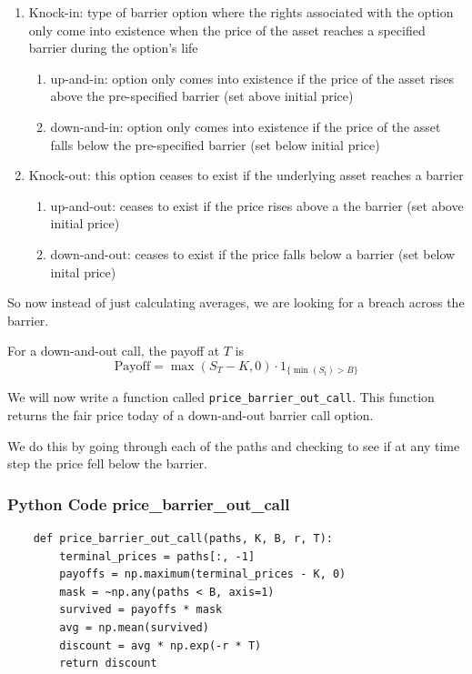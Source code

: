 \documentclass{article}
\begin{document}
\begin{enumerate}
    \item Knock-in: type of barrier option where the rights associated with the option only come into existence when the price of the asset reaches a specified barrier during the option's life
    \begin{enumerate}
        \item up-and-in: option only comes into existence if the price of the asset rises above the pre-specified barrier (set above initial price)
        \item down-and-in: option only comes into existence if the price of the asset falls below the pre-specified barrier (set below initial price)
    \end{enumerate}
    \item Knock-out: this option ceases to exist if the underlying asset reaches a barrier
    \begin{enumerate}
        \item up-and-out: ceases to exist if the price rises above a the barrier (set above initial price)
        \item down-and-out: ceases to exist if the price falls below a barrier (set below inital price)
    \end{enumerate}
\end{enumerate}

So now instead of just calculating averages, we are looking for a breach across the barrier.

For a down-and-out call, the payoff at \(T\) is \[\text{Payoff}=\max(S_T-K,0)\cdot1_{\{\min(S_t)>B\}}\]

We will now write a function called \texttt{price\_barrier\_out\_call}. This function returns the fair price today of a down-and-out barrier call option.

We do this by going through each of the paths and checking to see if at any time step the price fell below the barrier.

\subsubsection*{Python Code price\_barrier\_out\_call}
\begin{lstlisting}
    def price_barrier_out_call(paths, K, B, r, T):
        terminal_prices = paths[:, -1]
        payoffs = np.maximum(terminal_prices - K, 0)
        mask = ~np.any(paths < B, axis=1)
        survived = payoffs * mask
        avg = np.mean(survived)
        discount = avg * np.exp(-r * T)
        return discount
\end{lstlisting}
\end{document}
